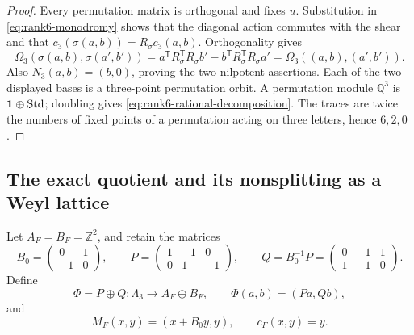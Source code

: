 \documentclass[11pt]{article}
\theoremstyle{definition}
\theoremstyle{remark}
\numberwithin{equation}{section}
\begin{document}
\begin{proof}
Every permutation matrix is orthogonal and fixes \(u\).  Substitution in
\eqref{eq:rank6-monodromy} shows that the diagonal action commutes with the
shear and that \(c_3(\sigma(a,b))=R_\sigma c_3(a,b)\).  Orthogonality gives
\[
 \Omega_3(\sigma(a,b),\sigma(a',b'))
 =a^{\mathsf T}R_\sigma^{\mathsf T}R_\sigma b'
  -b^{\mathsf T}R_\sigma^{\mathsf T}R_\sigma a'
 =\Omega_3((a,b),(a',b')).
\]
Also \(N_3(a,b)=(b,0)\), proving the two nilpotent assertions.  Each of the
two displayed bases is a three-point permutation orbit.  A permutation
module \(\mathbb Q^3\) is \(\mathbf1\oplus{\rm Std}\); doubling gives
\eqref{eq:rank6-rational-decomposition}.  The traces are twice the numbers
of fixed points of a permutation acting on three letters, hence \(6,2,0\).
\end{proof}

\subsection{The exact quotient and its nonsplitting as a Weyl lattice}

Let \(A_F=B_F=\mathbb Z^2\), and retain the matrices
\begin{equation}
 B_0=\begin{pmatrix}0&1\\-1&0\end{pmatrix},\qquad
 P=\begin{pmatrix}1&-1&0\\0&1&-1\end{pmatrix},\qquad
 Q=B_0^{-1}P=\begin{pmatrix}0&-1&1\\1&-1&0\end{pmatrix}.
                                                        \label{eq:rank6-pq}
\end{equation}
Define
\begin{equation}
 \Phi=P\oplus Q:\Lambda_3\longrightarrow A_F\oplus B_F,
 \qquad \Phi(a,b)=(Pa,Qb),                              \label{eq:rank6-phi}
\end{equation}
and
\[
 M_F(x,y)=(x+B_0y,y),\qquad c_F(x,y)=y.
\]
\end{document}
